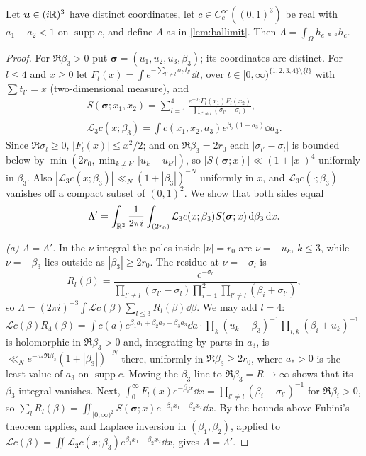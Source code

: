 \documentclass[11pt,colorlinks]{charlie}
\newcommand{\Om}{\Omega}
\begin{document}
\begin{lemma}\label{lem:balkernel}
Let $\boldsymbol u\in(i\mathbb{R})^3$ have distinct coordinates, let $c\in C_c^\infty((0,1)^3)$ be real with $a_1+a_2<1$ on $\operatorname{supp}c$, and define $\Lambda$ as in \cref{lem:ballimit}. Then $\Lambda=\int_\Om h_{e^{-\boldsymbol u\cdot a}}h_c$.
\end{lemma}
\begin{proof}
For $\Re\beta_3>0$ put $\boldsymbol\sigma=(u_1,u_2,u_3,\beta_3)$; its coordinates are distinct. For $l\le4$ and $x\ge0$ let $F_l(x)=\int e^{-\sum_{l'\ne l}\sigma_{l'}t_{l'}}\dd t$, over $t\in[0,\infty)^{\{1,2,3,4\}\setminus\{l\}}$ with $\sum t_{l'}=x$ (two-dimensional measure), and
\begin{gather*}
 S(\boldsymbol\sigma;x_1,x_2)=\sum_{l=1}^4\frac{e^{-\sigma_l}F_l(x_1)F_l(x_2)}{\prod_{l'\ne l}(\sigma_{l'}-\sigma_l)},\\
 \mathcal L_3c(x;\beta_3)=\int c(x_1,x_2,a_3)e^{\beta_3(1-a_3)}\dd a_3 .
\end{gather*}
Since $\Re\sigma_l\ge0$, $|F_l(x)|\le x^2/2$; and on $\Re\beta_3=2r_0$ each $|\sigma_{l'}-\sigma_l|$ is bounded below by $\min(2r_0,\min_{k\ne k'}|u_k-u_{k'}|)$, so $|S(\boldsymbol\sigma;x)|\ll(1+|x|)^4$ uniformly in $\beta_3$. Also $|\mathcal L_3c(x;\beta_3)|\ll_N(1+|\beta_3|)^{-N}$ uniformly in $x$, and $\mathcal L_3c(\cdot;\beta_3)$ vanishes off a compact subset of $(0,1)^2$. We show that both sides equal
\[
 \Lambda'=\int_{\mathbb{R}^2}\frac1{2\pi i}\int_{(2r_0)}\mathcal L_3c(x;\beta_3)S(\boldsymbol\sigma;x)\,\mathrm{d}\beta_3\,\mathrm{d} x .
\]

\emph{(a) $\Lambda=\Lambda'$.} In the $\nu$-integral the poles inside $|\nu|=r_0$ are $\nu=-u_k$, $k\le3$, while $\nu=-\beta_3$ lies outside as $|\beta_3|\ge2r_0$. The residue at $\nu=-\sigma_l$ is
\[
 R_l(\beta)=\frac{e^{-\sigma_l}}{\prod_{l'\ne l}(\sigma_{l'}-\sigma_l)\prod_{i=1}^2\prod_{l'\ne l}(\beta_i+\sigma_{l'})},
\]
so $\Lambda=(2\pi i)^{-3}\int\mathcal Lc(\beta)\sum_{l\le3}R_l(\beta)\dd\beta$. We may add $l=4$: $\mathcal Lc(\beta)R_4(\beta)=\int c(a)e^{\beta_1a_1+\beta_2a_2-\beta_3a_3}\dd a\cdot\prod_k(u_k-\beta_3)^{-1}\prod_{i,k}(\beta_i+u_k)^{-1}$ is holomorphic in $\Re\beta_3>0$ and, integrating by parts in $a_3$, is $\ll_N e^{-a_*\Re\beta_3}(1+|\beta_3|)^{-N}$ there, uniformly in $\Re\beta_3\ge2r_0$, where $a_*>0$ is the least value of $a_3$ on $\operatorname{supp}c$. Moving the $\beta_3$-line to $\Re\beta_3=R\to\infty$ shows that its $\beta_3$-integral vanishes. Next, $\int_0^\infty F_l(x)e^{-\beta_ix}\dd x=\prod_{l'\ne l}(\beta_i+\sigma_{l'})^{-1}$ for $\Re\beta_i>0$, so $\sum_lR_l(\beta)=\iint_{[0,\infty)^2}S(\boldsymbol\sigma;x)e^{-\beta_1x_1-\beta_2x_2}\dd x$. By the bounds above Fubini's theorem applies, and Laplace inversion in $(\beta_1,\beta_2)$, applied to $\mathcal Lc(\beta)=\iint\mathcal L_3c(x;\beta_3)e^{\beta_1x_1+\beta_2x_2}\dd x$, gives $\Lambda=\Lambda'$.


\end{proof}
\end{document}
